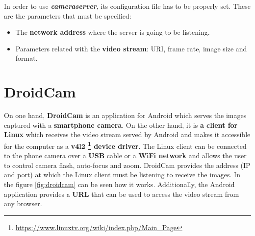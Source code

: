 In order to use \textbf{\textit{cameraserver}}, its configuration file has to be properly set. These are the parameters that must be specified:
\begin{itemize}
	\item The \textbf{network address} where the server is going to be listening.
	
	\item Parameters related with the \textbf{video stream}: URI, frame rate, image size and format.
\end{itemize}

\section{DroidCam}\label{sec:droidcam}
On one hand, \textbf{DroidCam} \cite{droidcam} is an application for Android which serves the images captured with a \textbf{smartphone camera}. On the other hand, it is \textbf{a client for Linux} which receives the video stream served by Android and makes it accessible for the computer as a \textbf{v4l2 \footnote{\url{https://www.linuxtv.org/wiki/index.php/Main_Page}} device driver}. The Linux client can be connected to the phone camera over a \textbf{USB} cable or a \textbf{WiFi network} and allows the user to control camera flash, auto-focus and zoom. DroidCam provides the address (IP and port) at which the Linux client must be listening to receive the images. In the figure \ref{fig:droidcam} can be seen how it works. Additionally, the Android application provides a \textbf{URL} that can be used to access the video stream from any browser. 
